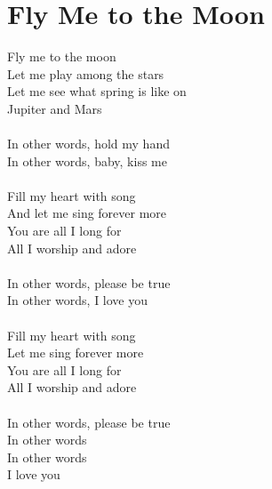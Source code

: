 \section{Fly Me to the Moon}
Fly me to the moon\\
Let me play among the stars\\
Let me see what spring is like on\\
Jupiter and Mars\\
\\
In other words, hold my hand\\
In other words, baby, kiss me\\
\\
Fill my heart with song\\
And let me sing forever more\\
You are all I long for\\
All I worship and adore\\
\\
In other words, please be true\\
In other words, I love you\\
\\
Fill my heart with song\\
Let me sing forever more\\
You are all I long for\\
All I worship and adore\\
\\
In other words, please be true\\
In other words\\
In other words\\
I love you\\